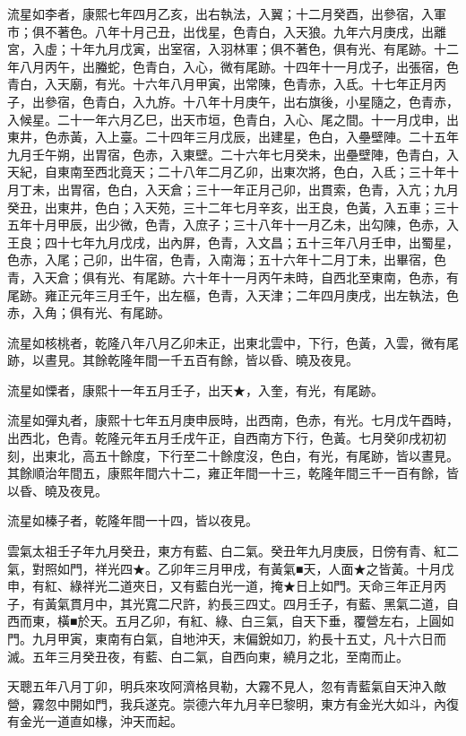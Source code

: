 \begin{pinyinscope}
流星如李者，康熙七年四月乙亥，出右執法，入翼；十二月癸酉，出參宿，入軍市；俱不著色。八年十月己丑，出伐星，色青白，入天狼。九年六月庚戌，出離宮，入虛；十年九月戊寅，出室宿，入羽林軍；俱不著色，俱有光、有尾跡。十二年八月丙午，出螣蛇，色青白，入心，微有尾跡。十四年十一月戊子，出張宿，色青白，入天廟，有光。十六年八月甲寅，出常陳，色青赤，入氐。十七年正月丙子，出參宿，色青白，入九斿。十八年十月庚午，出右旗後，小星隨之，色青赤，入候星。二十一年六月乙巳，出天市垣，色青白，入心、尾之間。十一月戊申，出東井，色赤黃，入上臺。二十四年三月戊辰，出建星，色白，入壘壁陣。二十五年九月壬午朔，出胃宿，色赤，入東壁。二十六年七月癸未，出壘壁陣，色青白，入天紀，自東南至西北竟天；二十八年二月乙卯，出東次將，色白，入氐；三十年十月丁未，出胃宿，色白，入天倉；三十一年正月己卯，出貫索，色青，入亢；九月癸丑，出東井，色白；入天苑，三十二年七月辛亥，出王良，色黃，入五車；三十五年十月甲辰，出少微，色青，入庶子；三十八年十一月乙未，出勾陳，色赤，入王良；四十七年九月戊戌，出內屏，色青，入文昌；五十三年八月壬申，出蜀星，色赤，入尾；己卯，出牛宿，色青，入南海；五十六年十二月丁未，出畢宿，色青，入天倉；俱有光、有尾跡。六十年十一月丙午未時，自西北至東南，色赤，有尾跡。雍正元年三月壬午，出左樞，色青，入天津；二年四月庚戌，出左執法，色赤，入角；俱有光、有尾跡。

流星如核桃者，乾隆八年八月乙卯未正，出東北雲中，下行，色黃，入雲，微有尾跡，以晝見。其餘乾隆年間一千五百有餘，皆以昏、曉及夜見。

流星如慄者，康熙十一年五月壬子，出天★，入奎，有光，有尾跡。

流星如彈丸者，康熙十七年五月庚申辰時，出西南，色赤，有光。七月戊午酉時，出西北，色青。乾隆元年五月壬戌午正，自西南方下行，色黃。七月癸卯戌初初刻，出東北，高五十餘度，下行至二十餘度沒，色白，有光，有尾跡，皆以晝見。其餘順治年間五，康熙年間六十二，雍正年間一十三，乾隆年間三千一百有餘，皆以昏、曉及夜見。

流星如榛子者，乾隆年間一十四，皆以夜見。

雲氣太祖壬子年九月癸丑，東方有藍、白二氣。癸丑年九月庚辰，日傍有青、紅二氣，對照如門，祥光四★。乙卯年三月甲戌，有黃氣■天，人面★之皆黃。十月戊申，有紅、綠祥光二道夾日，又有藍白光一道，掩★日上如門。天命三年正月丙子，有黃氣貫月中，其光寬二尺許，約長三四丈。四月壬子，有藍、黑氣二道，自西而東，橫■於天。五月乙卯，有紅、綠、白三氣，自天下垂，覆營左右，上圓如門。九月甲寅，東南有白氣，自地沖天，末偏銳如刀，約長十五丈，凡十六日而滅。五年三月癸丑夜，有藍、白二氣，自西向東，繞月之北，至南而止。

天聰五年八月丁卯，明兵來攻阿濟格貝勒，大霧不見人，忽有青藍氣自天沖入敵營，霧忽中開如門，我兵遂克。崇德六年九月辛巳黎明，東方有金光大如斗，內復有金光一道直如椽，沖天而起。


\end{pinyinscope}
